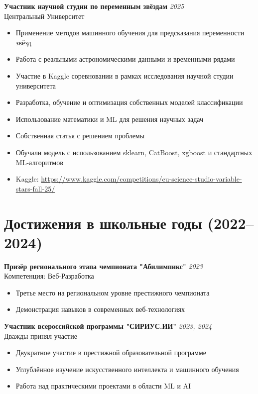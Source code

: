 \documentclass[11pt,a4paper]{article}
\newcommand{\hlpurple}[1]{\textcolor{pastelpurple}{#1}}
\newcommand{\achievement}[4]{
  \par\noindent
  \begin{minipage}{\textwidth}
  \textbf{\color{primarycolor}#1} \hfill {\color{secondarycolor}\textit{#2}}\\
  {\color{secondarycolor}#3}
  \vspace{2pt}

  #4
  \end{minipage}
  \vspace{4pt}
}
\begin{document}
\achievement
  {Участник научной студии по переменным звёздам}
  {2025}
  {Центральный Университет}
  {
    \begin{itemize}
      \item Применение методов машинного обучения для \hlpurple{предсказания переменности звёзд}
      \item Работа с реальными астрономическими данными и временными рядами
      \item Участие в Kaggle соревновании в рамках исследования научной студии университета
      \item Разработка, обучение и оптимизация собственных моделей классификации
      \item Использование математики и ML для решения научных задач
      \item Собственная статья с решением проблемы
      \item Обучали модель с использованием sklearn, CatBoost, xgboost и стандартных ML-алгоритмов
      \item Kaggle: \href{https://www.kaggle.com/competitions/cu-science-studio-variable-stars-fall-25/}{https://www.kaggle.com/competitions/cu-science-studio-variable-stars-fall-25/}
    \end{itemize}
  }

\newpage

\section{Достижения в школьные годы (2022--2024)}

\achievement
  {Призёр регионального этапа чемпионата "Абилимпикс"}
  {2023}
  {Компетенция: Веб-Разработка}
  {
    \begin{itemize}
      \item Третье место на региональном уровне престижного чемпионата
      \item Демонстрация навыков в современных веб-технологиях
    \end{itemize}
  }

\achievement
  {Участник всероссийской программы "СИРИУС.ИИ"}
  {2023, 2024}
  {Дважды принял участие}
  {
    \begin{itemize}
      \item Двукратное участие в престижной образовательной программе
      \item Углублённое изучение искусственного интеллекта и машинного обучения
      \item Работа над практическими проектами в области ML и AI
    \end{itemize}
  }
\end{document}
